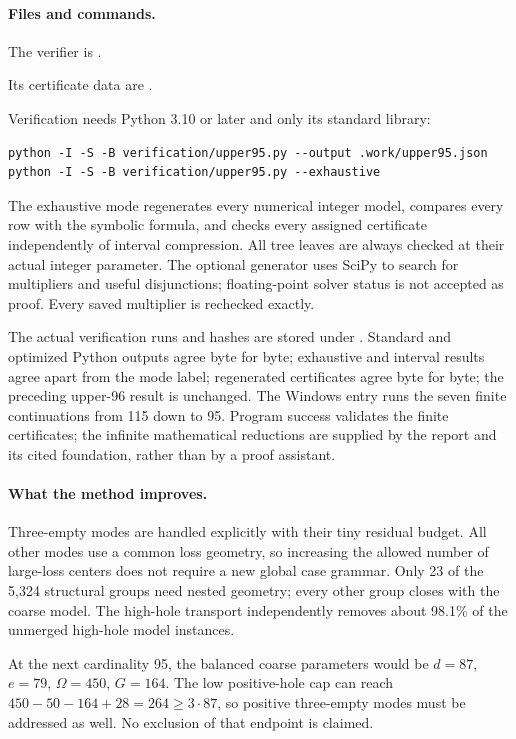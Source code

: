 \documentclass[11pt,a4paper]{article}
\begin{document}
\paragraph{Files and commands.}
The verifier is .\par
Its certificate data are .\par
Verification needs Python 3.10 or later and only its standard library:
\begin{verbatim}
python -I -S -B verification/upper95.py --output .work/upper95.json
python -I -S -B verification/upper95.py --exhaustive
\end{verbatim}
The exhaustive mode regenerates every numerical integer model, compares
every row with the symbolic formula, and checks every assigned
certificate independently of interval compression. All tree leaves are
always checked at their actual integer parameter. The optional generator
 uses SciPy to search
for multipliers and useful disjunctions; floating-point solver status
is not accepted as proof. Every saved multiplier is rechecked exactly.

The actual verification runs and hashes are stored under
. Standard and optimized Python
outputs agree byte for byte; exhaustive and interval results agree
apart from the mode label; regenerated certificates agree byte for
byte; the preceding upper-96 result is unchanged. The Windows entry
 runs the seven finite continuations
from 115 down to 95. Program success validates the finite certificates;
the infinite mathematical reductions are supplied by the report and
its cited foundation, rather than by a proof assistant.

\paragraph{What the method improves.}
Three-empty modes are handled explicitly with their tiny residual
budget. All other modes use a common loss geometry, so increasing the
allowed number of large-loss centers does not require a new global
case grammar. Only 23 of the 5,324 structural groups need nested geometry; every other
group closes with the coarse model. The high-hole transport independently
removes about 98.1\% of the unmerged high-hole model instances.

At the next cardinality 95, the balanced coarse parameters would be
$d=87$, $e=79$, $\Omega=450$, $G=164$. The low positive-hole cap can
reach $450-50-164+28=264\ge3\cdot87$, so positive three-empty modes
must be addressed as well. No exclusion of that endpoint is claimed.
\end{document}
